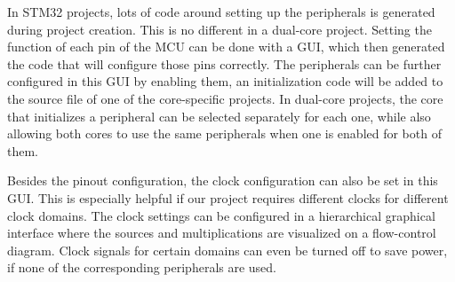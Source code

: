 In STM32 projects, lots of code around setting up the peripherals is generated during project creation. This is no different in a dual-core project. Setting the function of each pin of the MCU can be done with a GUI, which then generated the code that will configure those pins correctly. The peripherals can be further configured in this GUI by enabling them, an initialization code will be added to the  source file of  one of the core-specific projects. In dual-core projects, the core that initializes a peripheral can be selected separately for each one, while also allowing both cores to use the same peripherals when one is enabled for both of them.

Besides the pinout configuration, the clock configuration can also be set in this GUI. This is especially helpful if our project requires different clocks for different clock domains. The clock settings can be configured in a hierarchical graphical interface where the sources and multiplications are visualized on a flow-control diagram. Clock signals for certain domains can even be turned off to save power, if none of the corresponding peripherals are used.
